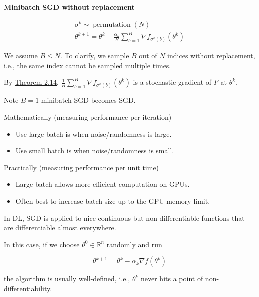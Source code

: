 \begin{definition}
    \textbf{Minibatch SGD without replacement}

    $$
    \begin{gathered}
    \sigma^{k} \sim \operatorname{permutation}(N) \\
    \theta^{k+1}=\theta^{k}-\frac{\alpha_{k}}{B} \sum_{b=1}^{B} \nabla f_{\sigma^{k}(b)}\left(\theta^{k}\right)
    \end{gathered}
    $$

    We assume $B \leq N$. To clarify, we sample $B$ out of $N$ indices without replacement, i.e., the same index cannot be sampled multiple times.

    By \hyperref[theorem:2.14]{Theorem 2.14}, $\frac{1}{B} \sum_{b=1}^{B} \nabla f_{\sigma^{k}(b)}\left(\theta^{k}\right)$ is a stochastic gradient of $F$ at $\theta^{k}$.
\end{definition}

\begin{concept}
    Note $B=1$ minibatch SGD becomes SGD.

    Mathematically (measuring performance per iteration)

    \begin{itemize}
        \item Use large batch is when noise/randomness is large.
        \item Use small batch is when noise/randomness is small.
    \end{itemize}

    Practically (measuring performance per unit time)

    \begin{itemize}
        \item Large batch allows more efficient computation on GPUs.
        \item Often best to increase batch size up to the GPU memory limit.
    \end{itemize}
\end{concept}

In DL, SGD is applied to nice continuous but non-differentiable functions that are differentiable almost everywhere.

In this case, if we choose $\theta^{0} \in \mathbb{R}^{n}$ randomly and run

$$
\theta^{k+1}=\theta^{k}-\alpha_{k} \nabla f\left(\theta^{k}\right)
$$

the algorithm is usually well-defined, i.e., $\theta^{k}$ never hits a point of non-differentiability.

